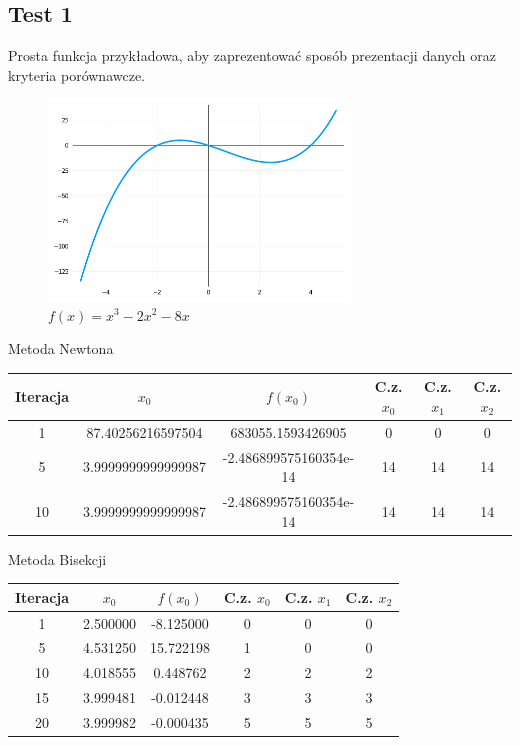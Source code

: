 \documentclass[a4paper]{article}
\begin{document}
    \subsection{Test 1}
    Prosta funkcja przykładowa, aby zaprezentować sposób prezentacji danych oraz kryteria porównawcze.
    \begin{figure}[h]
        \centering
        \includegraphics[width=8cm]{1}
        \caption{$f(x) = x^3 - 2x^2 - 8x$}
    \end{figure}
    
    \begin{center}
        Metoda Newtona
    \end{center}
    \begin{center}
        \begin{tabular}{|c|c|c|c|c|c|} 
            \hline
            Iteracja & $x_0$ & $f(x_0)$ & C.z. $x_0$ & C.z. $x_1$ & C.z. $x_2$ \\
            \hline
            1 & 87.40256216597504 & 683055.1593426905 & 0 & 0 & 0 \\
            \hline
            5 & 3.9999999999999987 & -2.486899575160354e-14 & 14 & 14 & 14 \\
            \hline
            10 & 3.9999999999999987 & -2.486899575160354e-14 & 14 & 14 & 14 \\
            \hline
        \end{tabular}
    \end{center}
        
    \vspace{5mm}

    \begin{center}
        Metoda Bisekcji
    \end{center}
    \begin{center}
        \begin{tabular}{|c|c|c|c|c|c|} 
            \hline
            Iteracja & $x_0$ & $f(x_0)$ & C.z. $x_0$ & C.z. $x_1$ & C.z. $x_2$ \\
            \hline
            1 & 2.500000 & -8.125000 & 0 & 0 & 0 \\
            \hline
            5 & 4.531250 & 15.722198 & 1 & 0 & 0 \\
            \hline
            10 & 4.018555 & 0.448762 & 2 & 2 & 2 \\
            \hline
            15 & 3.999481 & -0.012448 & 3 & 3 & 3 \\
            \hline
            20 & 3.999982 & -0.000435 & 5 & 5 & 5 \\
            \hline
        \end{tabular}
    \end{center}
    
\end{document}
